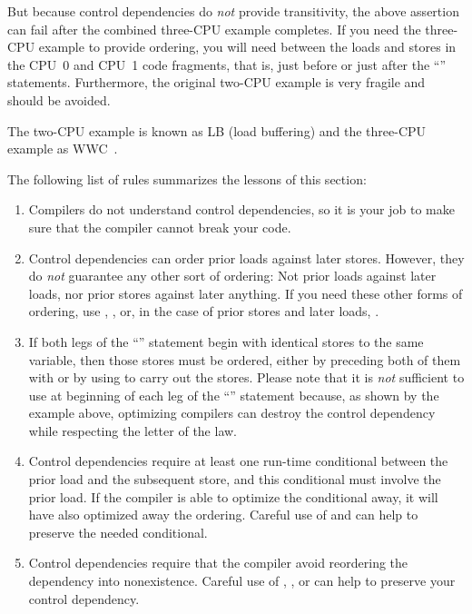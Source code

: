 But because control dependencies do \emph{not} provide transitivity, the above
assertion can fail after the combined three-CPU example completes.
If you need the three-CPU example to provide ordering, you will need
 between the loads and stores in the CPU~0 and CPU~1 code
fragments, that is, just before or just after the ``'' statements.
Furthermore, the original two-CPU example is very fragile and should be avoided.

The two-CPU example is known as LB (load buffering) and the three-CPU
example as WWC~\cite{Maranget2012TutorialARMPower}.

The following list of rules summarizes the lessons of this section:

\begin{enumerate}
\item	Compilers do not understand control dependencies, so it is
	your job to make sure that the compiler cannot break your code.

\item	Control dependencies can order prior loads against later stores.
	However, they do \emph{not} guarantee any other sort of ordering:
	Not prior loads against later loads, nor prior stores against
	later anything.
	If you need these other forms of ordering, use ,
	, or, in the case of prior stores and later loads,
	.

\item	If both legs of the ``'' statement begin with identical stores
	to the same variable, then those stores must be ordered,
	either by preceding both of them with  or by using
	 to carry out the stores.
	Please note that it is \emph{not} sufficient to use 
	at beginning of each leg of the ``'' statement because, as shown
	by the example above, optimizing compilers can destroy the control
	dependency while respecting the letter of the  law.

\item	Control dependencies require at least one run-time conditional
	between the prior load and the subsequent store, and this
	conditional must involve the prior load.
	If the compiler is able to optimize the conditional away, it
	will have also optimized away the ordering.
	Careful use of  and  can help
	to preserve the needed conditional.

\item	Control dependencies require that the compiler avoid reordering
	the dependency into nonexistence.
	Careful use of , , or
	 can help to preserve your control
	dependency.


\end{enumerate}
